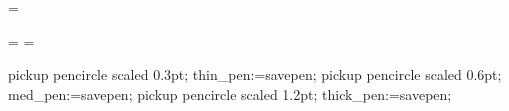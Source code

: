 
\newcount\footnoteno {}

\def\footnote#1{\edef\@sf{\spacefactor\the\spacefactor}%
 \global\advance\d@stno1\goto{#1}{\number\d@stno}\@sf
 \insert\footins\bgroup \interlinepenalty100 \eightpt
 \let\par=\endgraf \leftskip=0pt \rightskip=0pt
 \splittopskip=10pt plus 1pt minus 1pt \floatingpenalty=20000
 \smallskip\ifcase\pdfoutput
  \special{pdf: dest (num \number\d@stno) [@thispage /FitBH @ypos]}\else
  \pdfdest num \number\d@stno fitbh\fi
 \item{#1}\bgroup\strut\aftergroup\@foot\let\next}
\skip\footins=\bigskipamount
\dimen{}\vsize
\def\footnoterule{\kern-3pt \hrule width 3cm \kern 2.6pt\nobreak}


\newdimen\fullhsize \fullhsize=\hsize
\newdimen\fullvsize \fullvsize=\vsize
\def\fullline{\hbox to\fullhsize}

\newdimen\gutter \gutter=5mm %
\newbox\partialpage
\def\begindoublecolumns{\begingroup
 \output={\global\setbox\partialpage=\vbox{\unvbox255\bigskip}}\eject
 \output={\doublecolumnout}%
 \hsize=\fullhsize \advance\hsize by-\gutter \divide\hsize by2
 \vsize=\fullvsize \multiply\vsize by2 \advance\vsize by1pc}
\def\enddoublecolumns{\output={\balancecolumns}\eject
 \endgroup \pagegoal=\vsize}

\def\doublecolumnout{\splittopskip=\topskip \splitmaxdepth=\maxdepth
 \dimen0=\fullvsize \advance\dimen0 by-\ht\partialpage
 \setbox0=\vsplit255 to\dimen0 \setbox2=\vsplit255 to\dimen0
 \shipout\vbox{\vbox to0pt{\vskip-22.5pt
  \fullline{\vbox to8.5pt{}\the\headline}\vss}\nointerlineskip
  \vbox to\fullvsize{\boxmaxdepth=\maxdepth \pagesofar}
  \baselineskip=24pt \fullline{\the\footline}}\advancepageno
 \unvbox255 \penalty\outputpenalty}
\def\balancecolumns{\setbox0=\vbox{\unvbox255}\dimen0=\ht0
 \advance\dimen0 by\topskip \advance\dimen0 by-\baselineskip
 \divide\dimen0 by2 \splittopskip=\topskip
 {\vbadness=10000 \loop \global\setbox3=\copy0
  \global\setbox1=\vsplit3 to\dimen0
  \ifdim\ht3>\dimen0 \global\advance\dimen0 by1pt \repeat}
 \setbox0=\vbox to\dimen0{\unvbox1}%
 \setbox2=\vbox to\dimen0{\dimen2=\dp3 \unvbox3 \kern-\dimen2 \vfil}%
 \pagesofar}
\def\pagesofar{\unvbox\partialpage \fullline{\box0\hfil\box2}}


\def\MTendmark{:::}

\MTcode
pickup pencircle scaled 0.3pt; thin_pen:=savepen;
pickup pencircle scaled 0.6pt; med_pen:=savepen;
pickup pencircle scaled 1.2pt; thick_pen:=savepen;

